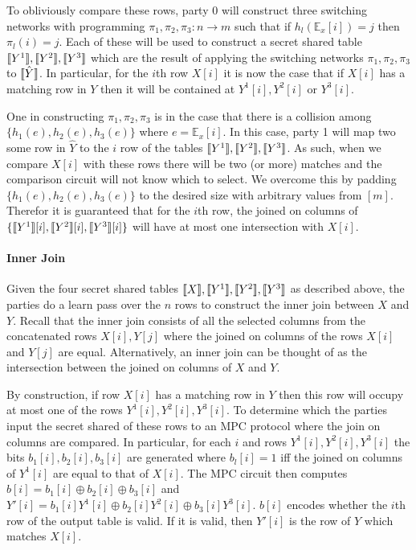 To obliviously compare these rows, party 0 will construct three switching networks with programming $\pi_1,\pi_2,\pi_3 : n\rightarrow m$ such that if $h_l(\mathbb{E}_x[i])=j$ then $\pi_l(i)=j$. Each of these will be used to construct a secret shared table $\llbracket Y^1\rrbracket,\llbracket Y^2\rrbracket,\llbracket Y^3\rrbracket$ which are the result of applying the switching networks $\pi_1,\pi_2,\pi_3$ to $\llbracket \hat Y\rrbracket$. In particular, for the $i$th row $X[i]$ it is now the case that if $X[i]$ has a matching row in $Y$ then it will be contained at  $Y^1[i],Y^2[i]$ or ${Y^3}[i]$. 

One in constructing $\pi_1,\pi_2,\pi_3$ is in the case that there is a collision among $\{h_1(e),h_2(e), h_3(e)\}$ where $e= \mathbb{E}_x[i]$. In this case, party 1 will map two some row in $\hat Y$ to the $i$ row of the tables $\llbracket Y^1\rrbracket,\llbracket Y^2\rrbracket,\llbracket Y^3\rrbracket$. As such, when we compare $X[i]$ with these rows there will be two (or more) matches and the comparison circuit will not know which to select. We overcome this by padding $\{h_1(e),h_2(e), h_3(e)\}$ to the desired size with arbitrary values from $[m]$. Therefor it is guaranteed that for the $i$th row, the joined on columns of $\{\llbracket Y^1\rrbracket[i],\llbracket Y^2\rrbracket[i],\llbracket Y^3\rrbracket[i]\}$ will  have at most one intersection with $X[i]$.


\paragraph{Inner Join}

Given the four secret shared tables $\llbracket X\rrbracket,\llbracket Y^1\rrbracket,\llbracket Y^2\rrbracket,\llbracket Y^3\rrbracket$ as described above, the parties do a learn pass over the $n$ rows to construct the inner join between $X$ and $Y$. Recall that the inner join consists of all the selected columns from the concatenated rows $X[i],Y[j]$ where  the joined on columns of the rows $X[i]$ and $Y[j]$ are equal. Alternatively, an inner join can be thought of as the intersection between the joined on columns of $X$ and $Y$. 

By construction, if row $X[i]$ has a matching row in $Y$ then this row will occupy at most one of the rows ${Y^1}[i],{Y^2}[i],{Y^3}[i]$. To determine which the parties input the secret shared of these rows to an MPC protocol where the join on columns are compared. In particular, for each $i$ and rows ${Y^1}[i],{Y^2}[i],{Y^3}[i]$ the bits $b_1[i],b_2[i],b_3[i]$ are generated where $b_l[i]=1$ iff the joined on columns of ${Y^1}[i]$ are equal to that of $X[i]$. The MPC circuit then computes $b[i]=b_1[i]\oplus b_2[i]\oplus b_3[i]$ and $Y'[i]=b_1[i]{Y^1}[i]\oplus b_2[i]{Y^2}[i]\oplus b_3[i]{Y^3}[i]$. $b[i]$ encodes whether the $i$th row of the output table is valid. If it is valid, then $Y'[i]$ is the row of $Y$ which matches $X[i]$.

